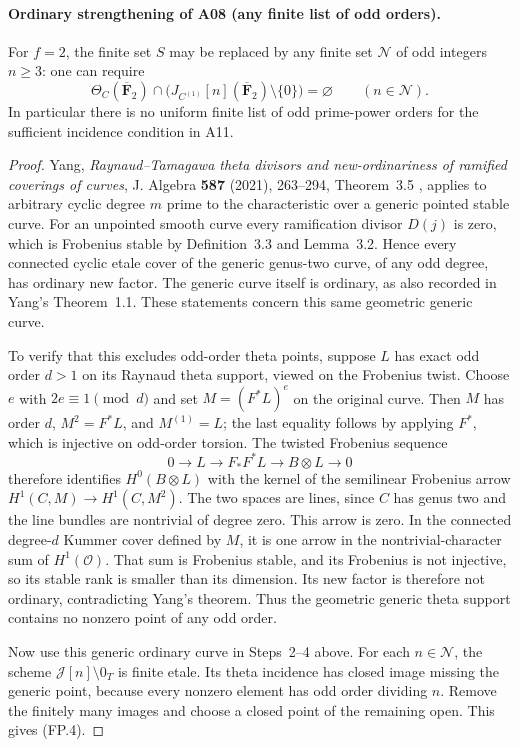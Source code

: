 \documentclass[11pt,a4paper]{article}
\begin{document}
\paragraph{Ordinary strengthening of A08 (any finite list of odd orders).}
For $f=2$, the finite set $S$ may be replaced by any finite set
$\mathcal N$ of odd integers $n\ge3$: one can require
\[
 \Theta_C(\overline{\mathbf F}_2)\cap
 \bigl(J_{C^{(1)}}[n](\overline{\mathbf F}_2)\setminus\{0\}\bigr)
 =\varnothing\qquad(n\in\mathcal N).
 \tag{FP.4}
\]
In particular there is no uniform finite list of odd prime-power
orders for the sufficient incidence condition in A11.

\begin{proof}
Yang, \emph{Raynaud--Tamagawa theta divisors and new-ordinariness of
ramified coverings of curves}, J. Algebra \textbf{587} (2021),
263--294, Theorem~3.5 \cite{Yang2021}, applies to arbitrary cyclic degree $m$
prime to the characteristic over a generic pointed stable curve.
For an unpointed smooth curve every ramification divisor $D(j)$
is zero, which is Frobenius stable by Definition~3.3 and
Lemma~3.2.  Hence every connected cyclic etale cover of the
generic genus-two curve, of any odd degree, has ordinary new
factor.  The generic curve itself is ordinary, as also recorded
in Yang's Theorem~1.1.  These statements concern this same
geometric generic curve.

To verify that this excludes odd-order theta points, suppose $L$
has exact odd order $d>1$ on its Raynaud theta support, viewed on
the Frobenius twist.  Choose $e$ with $2e\equiv1\pmod d$ and set
$M=(F^*L)^e$ on the original curve.  Then $M$ has order $d$,
$M^2=F^*L$, and $M^{(1)}=L$; the last equality follows by applying
$F^*$, which is injective on odd-order torsion.
The twisted Frobenius sequence
\[
 0\longrightarrow L\longrightarrow F_*F^*L
 \longrightarrow B\otimes L\longrightarrow0
\]
therefore identifies $H^0(B\otimes L)$ with the kernel of the
semilinear Frobenius arrow
$H^1(C,M)\to H^1(C,M^2)$.
The two spaces are lines, since $C$ has genus two and the line
bundles are nontrivial of degree zero.  This arrow is zero.
In the connected degree-$d$ Kummer cover defined by $M$, it is
one arrow in the nontrivial-character sum of $H^1(\mathcal O)$.
That sum is Frobenius stable, and its Frobenius is not injective,
so its stable rank is smaller than its dimension.  Its new
factor is therefore not ordinary, contradicting Yang's theorem.
Thus the geometric generic theta support contains no nonzero
point of any odd order.

Now use this generic ordinary curve in Steps~2--4 above.  For each
$n\in\mathcal N$, the scheme $\mathcal J[n]\setminus0_T$ is finite
etale.  Its theta incidence has closed image missing the generic
point, because every nonzero element has odd order dividing $n$.
Remove the finitely many images and choose a closed point of the
remaining open.  This gives (FP.4).
\end{proof}
\end{document}
